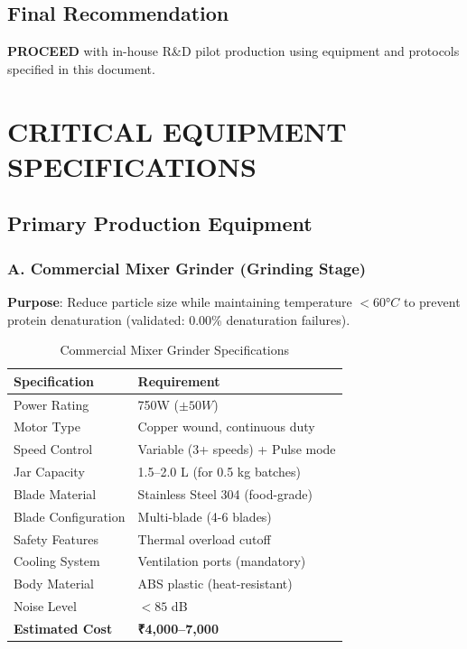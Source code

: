 \documentclass[12pt,a4paper]{article}
\begin{document}
\subsection{Final Recommendation}
\textbf{PROCEED} with in-house R\&D pilot production using equipment and protocols specified in this document.

\section{CRITICAL EQUIPMENT SPECIFICATIONS}

\subsection{Primary Production Equipment}

\subsubsection{A. Commercial Mixer Grinder (Grinding Stage)}

\textbf{Purpose}: Reduce particle size while maintaining temperature $< 60°C$ to prevent protein denaturation (validated: 0.00\% denaturation failures).

\begin{table}[h]
\centering
\begin{tabular}{p{5cm}p{8cm}}
\toprule
\textbf{Specification} & \textbf{Requirement} \\
\midrule
Power Rating & 750W ($\pm 50W$) \\
Motor Type & Copper wound, continuous duty \\
Speed Control & Variable (3+ speeds) + Pulse mode \\
Jar Capacity & 1.5--2.0 L (for 0.5 kg batches) \\
Blade Material & Stainless Steel 304 (food-grade) \\
Blade Configuration & Multi-blade (4-6 blades) \\
Safety Features & Thermal overload cutoff \\
Cooling System & Ventilation ports (mandatory) \\
Body Material & ABS plastic (heat-resistant) \\
Noise Level & $< 85$ dB \\
\textbf{Estimated Cost} & \textbf{₹4,000--7,000} \\
\bottomrule
\end{tabular}
\caption{Commercial Mixer Grinder Specifications}
\end{table}
\end{document}
